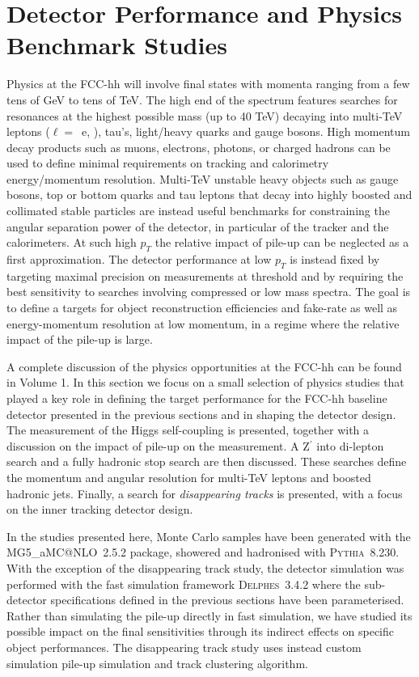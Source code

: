 \documentclass[11pt,twoside,a4paper]{cernrep}
\begin{document}
\section{Detector Performance and Physics Benchmark Studies}

Physics at the FCC-hh will involve final states with momenta ranging from a few tens of GeV to tens of TeV. The high end of the spectrum features searches for resonances at the highest possible mass (up to 40 TeV) decaying into multi-TeV leptons ($\ell=$~e, \textmu), tau's, light/heavy quarks and gauge bosons. High momentum decay products such as muons, electrons, photons, or charged hadrons can be used to define minimal requirements on tracking and calorimetry energy/momentum resolution. Multi-TeV unstable heavy objects such as gauge bosons, top or bottom quarks and tau leptons that decay into highly boosted and collimated stable particles are instead useful benchmarks for constraining the angular separation power of the detector, in particular of the tracker and the calorimeters. At such high $p_{T}$ the relative impact of pile-up can be neglected as a first approximation.
The detector performance at low $p_{T}$ is instead fixed by targeting maximal precision on measurements at threshold and by requiring the best sensitivity to searches involving compressed or low mass spectra. The goal is to define a targets for object reconstruction efficiencies and fake-rate as well as energy-momentum resolution at low momentum, in a regime where the relative impact of the pile-up is large.

A complete discussion of the physics opportunities at the FCC-hh can be found in Volume 1. In this section we focus on a small selection of physics studies that played a key role in defining the target performance for the FCC-hh baseline detector presented in the previous sections and in shaping the detector design. The measurement of the Higgs self-coupling is presented, together with a discussion on the impact of pile-up on the measurement. A Z$^{\prime}$ into di-lepton search and a fully hadronic stop search are then discussed. These searches define the momentum and angular resolution for multi-TeV leptons and boosted hadronic jets. Finally, a search for \emph{disappearing tracks} is presented, with a focus on the inner tracking detector design.

In the studies presented here, Monte Carlo samples have been generated with the {\scshape MG5\_}a{\scshape MC@NLO}~2.5.2 package, showered and hadronised with {\scshape Pythia}~8.230. With the exception of the disappearing track study, the detector simulation was performed with the fast simulation framework {\scshape Delphes}~3.4.2 where the sub-detector specifications defined in the previous sections have been parameterised. Rather than simulating the pile-up directly in fast simulation, we have studied its possible impact on the final sensitivities through its indirect effects on specific object performances. The disappearing track study uses instead custom simulation  pile-up simulation and track clustering algorithm.
\end{document}
